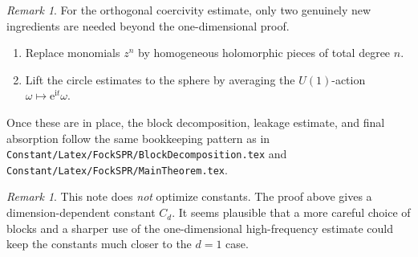 \documentclass[11pt]{amsart}
\theoremstyle{remark}
\newtheorem{remark}[theorem]{Remark}
\newcommand{\ee}{\mathrm{e}}
\newcommand{\ii}{\mathrm{i}}
\begin{document}
\begin{remark}
For the orthogonal coercivity estimate, only two genuinely new ingredients
are needed beyond the one-dimensional proof.
\begin{enumerate}[(1)]
\item Replace monomials $z^n$ by homogeneous holomorphic pieces of total
degree $n$.
\item Lift the circle estimates to the sphere by averaging the
$U(1)$-action $\omega \mapsto \ee^{\ii t}\omega$.
\end{enumerate}
Once these are in place, the block decomposition, leakage estimate, and
final absorption follow the same bookkeeping pattern as in
\texttt{Constant/Latex/FockSPR/BlockDecomposition.tex} and
\texttt{Constant/Latex/FockSPR/MainTheorem.tex}.
\end{remark}

\begin{remark}
This note does \emph{not} optimize constants.  The proof above gives a
dimension-dependent constant $C_d$.  It seems plausible that a more careful
choice of blocks and a sharper use of the one-dimensional high-frequency
estimate could keep the constants much closer to the $d=1$ case.
\end{remark}
\end{document}
